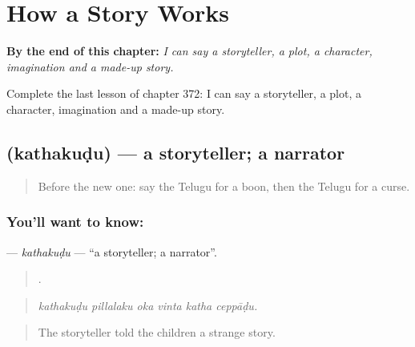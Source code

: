 
\chapter{How a Story Works}
\label{ch:te-how-a-story-works}

\begin{chapteropening}
\textbf{By the end of this chapter:} \emph{I can say a storyteller, a plot, a character, imagination and a made-up story.}

Complete the last lesson of chapter 372: I can say a storyteller, a plot, a character, imagination and a made-up story.
\end{chapteropening}

\section[\texorpdfstring{\te{కథకుడు} (kathakuḍu)}{కథకుడు (kathakuḍu)}]{ (kathakuḍu) — a storyteller; a narrator}

\label{lesson:TE-C372-kathakudu}



\begin{quote}
Before the new one: say the Telugu for a boon, then the Telugu for a curse.
\end{quote}

\subsection*{You'll want to know: }
\textbf{} — \emph{kathakuḍu} — \textquotedblleft{}a storyteller; a narrator\textquotedblright{}.

\begin{quote}
     .
\end{quote}

\begin{quote}
\emph{kathakuḍu pillalaku oka vinta katha ceppāḍu.}
\end{quote}

\begin{quote}
The storyteller told the children a strange story.
\end{quote}

